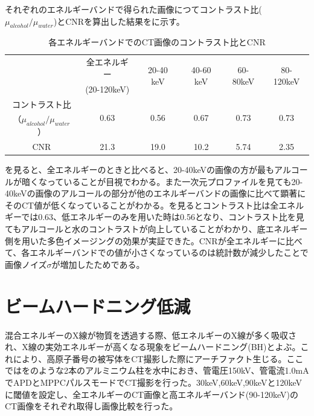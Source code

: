それぞれのエネルギーバンドで得られた画像につてコントラスト比($\mu_{alcohol}/\mu_{water}$)とCNRを算出した結果をに示す。
\begin{table}[H]
  \centering
    \begin{tabular}{cccccc}
    \toprule
    \multirow{2}[2]{*}{} & 全エネルギー & \multirow{2}[2]{*}{20-40 keV} & \multirow{2}[2]{*}{40-60 keV} & \multirow{2}[2]{*}{60-80keV} & \multirow{2}[2]{*}{80-120keV} \\
          & (20-120keV) &       &       &       &  \\
    \midrule
    コントラスト比 & \multirow{2}[1]{*}{0.63} & \multirow{2}[1]{*}{0.56} & \multirow{2}[1]{*}{0.67} & \multirow{2}[1]{*}{0.73} & \multirow{2}[1]{*}{0.73} \\
    （$\mu_{alcohol}/\mu_{water}$） &       &       &       &       &  \\
    CNR   & 21.3  & 19.0    & 10.2  & 5.74  & 2.35 \\
    \bottomrule
    \end{tabular}%
      \caption{各エネルギーバンドでのCT画像のコントラスト比とCNR}
  \label{tab:low_contrast}%
\end{table}%


を見ると、全エネルギーのときと比べると、20-40keVの画像の方が最もアルコールが暗くなっていることが目視でわかる。また一次元プロファイルを見ても20-40keVの画像のアルコールの部分が他のエネルギーバンドの画像に比べて顕著にそのCT値が低くなっていることがわかる。を見るとコントラスト比は全エネルギーでは0.63、低エネルギーのみを用いた時は0.56となり、コントラスト比を見てもアルコールと水のコントラストが向上していることがわかり、底エネルギー側を用いた多色イメージングの効果が実証できた。CNRが全エネルギーに比べて、各エネルギーバンドでの値が小さくなっているのは統計数が減少したことで画像ノイズ$\sigma$が増加したためである。

\section{ビームハードニング低減}
混合エネルギーのX線が物質を透過する際、低エネルギーのX線が多く吸収され、X線の実効エネルギーが高くなる現象をビームハードニング(BH)とよぶ。これにより、高原子番号の被写体をCT撮影した際にアーチファクト生じる。ここではをのような2本のアルミニウム柱を水中におき、管電圧150kV、管電流1.0mAでAPDとMPPCパルスモードでCT撮影を行った。30keV,60keV,90keVと120keVに閾値を設定し、全エネルギーのCT画像と高エネルギーバンド(90-120keV)のCT画像をそれぞれ取得し画像比較を行った。

